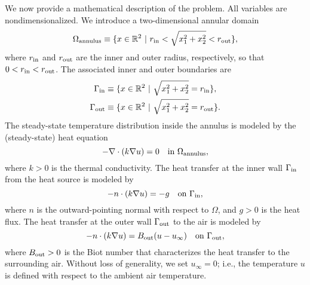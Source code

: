 \documentclass[preprint,11pt]{article}
\begin{document}
We now provide a mathematical description of the problem.  All variables are nondimensionalized.  We introduce a two-dimensional annular domain
\begin{equation*}
  \Omega_{\rm annulus} \equiv \{ x \in \mathbb{R}^2 \ | \ r_{\rm in} < \sqrt{x_1^2 + x_2^2} < r_{\rm out} \},
\end{equation*}
where $r_{\rm in}$ and $r_{\rm out}$ are the inner and outer radius, respectively, so that $0 < r_{\rm in} < r_{\rm out}$. The associated inner and outer boundaries are
\begin{align*}
  \Gamma_{\rm in} &\equiv \{ x \in \mathbb{R}^2 \ | \ \sqrt{x_1^2 + x_2^2} = r_{\rm in} \}, \\
  \Gamma_{\rm out} &\equiv \{ x \in \mathbb{R}^2 \ | \ \sqrt{x_1^2 + x_2^2} = r_{\rm out} \}.
\end{align*}
The steady-state temperature distribution inside the annulus is modeled by the (steady-state) heat equation
\begin{equation*}
  - \nabla \cdot (k \nabla u) = 0 \quad \text{in } \Omega_{\rm annulus} ,
\end{equation*}
where $k > 0$ is the thermal conductivity. The heat transfer at the inner wall $\Gamma_{\rm in}$ from the heat source is modeled by
\begin{equation*}
  - n \cdot (k \nabla u) = -g \quad \text{on } \Gamma_{\rm in},
\end{equation*}
where $n$ is the outward-pointing normal with respect to $\Omega$, and $g > 0$ is the heat flux. %
The heat transfer at the outer wall $\Gamma_{\rm out}$ to the air is modeled by 
\begin{equation*}
  - n \cdot (k \nabla u) = B_{\rm out} (u - u_{\infty})  \quad \text{on } \Gamma_{\rm out},
\end{equation*}
where $B_{\rm out} > 0$ is the Biot number that characterizes the heat transfer to the surrounding air.  Without loss of generality, we set $u_{\infty} = 0$; i.e., the temperature $u$ is defined with respect to the ambient air temperature.
\end{document}
